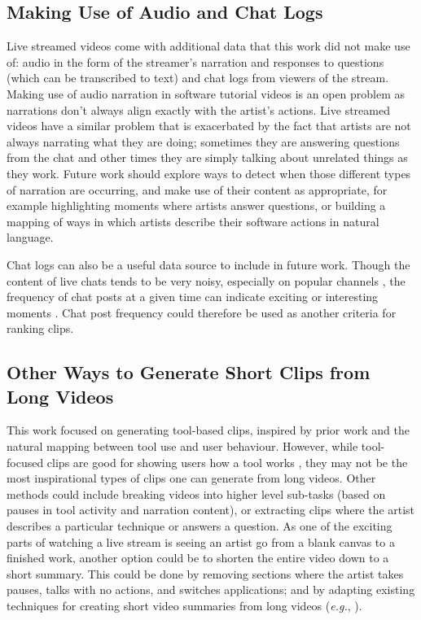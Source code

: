 \subsection{Making Use of Audio and Chat Logs}
Live streamed videos come with additional data that this work did not make use of: audio in the form of the streamer's narration and responses to questions (which can be transcribed to text) and chat logs from viewers of the stream. Making use of audio narration in software tutorial videos is an open problem \cite{Chi2012} as narrations don't always align exactly with the artist's actions. Live streamed videos have a similar problem that is exacerbated by the fact that artists are not always narrating what they are doing; sometimes they are answering questions from the chat and other times they are simply talking about unrelated things as they work. Future work should explore ways to detect when those different types of narration are occurring, and make use of their content as appropriate, for example highlighting moments where artists answer questions, or building a mapping of ways in which artists describe their software actions in natural language.

Chat logs can also be a useful data source to include in future work. Though the content of live chats tends to be very noisy, especially on popular channels \cite{Hamilton2014}, the frequency of chat posts at a given time can indicate exciting or interesting moments \cite{Pan2016}. Chat post frequency could therefore be used as another criteria for ranking clips.

\subsection{Other Ways to Generate Short Clips from Long Videos}
This work focused on generating tool-based clips, inspired by prior work \cite{Grossman2010a, Lafreniere2014} and the natural mapping between tool use and user behaviour. However, while tool-focused clips are good for showing users how a tool works \cite{Grossman2010a}, they may not be the most inspirational types of clips one can generate from long videos. Other methods could include breaking videos into higher level sub-tasks (based on pauses in tool activity and narration content), or extracting clips where the artist describes a particular technique or answers a question. As one of the exciting parts of watching a live stream is seeing an artist go from a blank canvas to a finished work, another option could be to shorten the entire video down to a short summary. This could be done by removing sections where the artist takes pauses, talks with no actions, and switches applications; and by adapting existing techniques for creating short video summaries from long videos (\textit{e.g.}, \cite{Truong2007}). 


